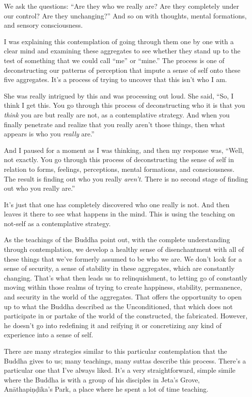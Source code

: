 We ask the questions: ``Are they who we really are? Are they completely under our control? Are they unchanging?'' And so on with thoughts, mental formations, and sensory consciousness.

I was explaining this contemplation of going through them one by one with a clear mind and examining these aggregates to see whether they stand up to the test of something that we could call ``me'' or ``mine.'' The process is one of deconstructing our patterns of perception that impute a sense of self onto these five aggregates. It's a process of trying to uncover that this isn't who I am.

She was really intrigued by this and was processing out loud. She said, ``So, I think I get this. You go through this process of deconstructing who it is that you \emph{think} you are but really are not, as a contemplative strategy. And when you finally penetrate and realize that you really aren't those things, then what appears is who you \emph{really} are.''

And I paused for a moment as I was thinking, and then my response was, ``Well, not exactly. You go through this process of deconstructing the sense of self in relation to forms, feelings, perceptions, mental formations, and consciousness. The result is finding out who you really \emph{aren't}. There is no second stage of finding out who you really are.''

It's just that one has completely discovered who one really is not. And then leaves it there to see what happens in the mind. This is using the teaching on not-self as a contemplative strategy.

As the teachings of the Buddha point out, with the complete understanding through contemplation, we develop a healthy sense of disenchantment with all of these things that we've formerly assumed to be who we are. We don't look for a sense of security, a sense of stability in these aggregates, which are constantly changing. That's what then leads us to relinquishment, to letting go of constantly moving within those realms of trying to create happiness, stability, permanence, and security in the world of the aggregates. That offers the opportunity to open up to what the Buddha described as the Unconditioned, that which does not participate in or partake of the world of the constructed, the fabricated. However, he doesn't go into redefining it and reifying it or concretizing any kind of experience into a sense of self.

There are many strategies similar to this particular contemplation that the Buddha gives to us; many teachings, many suttas describe this process. There's a particular one that I've always liked. It's a very straightforward, simple simile where the Buddha is with a group of his disciples in Jeta's Grove, Anāthapiṇḍika's Park, a place where he spent a lot of time teaching.

